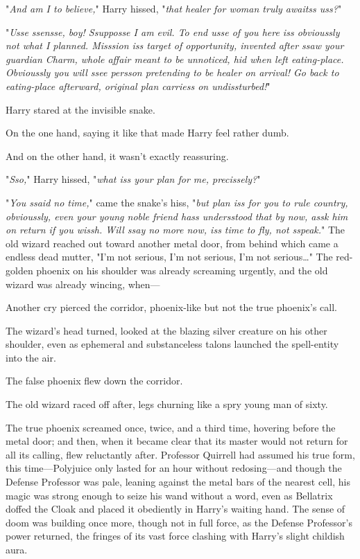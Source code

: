 "\emph{And am I to believe,}" Harry hissed, "\emph{that healer for woman truly 
awaitss uss?}"

"\emph{Usse ssensse, boy! Ssupposse I am evil. To end usse of you here iss 
obvioussly not what I planned. Misssion iss target of opportunity, invented 
after ssaw your guardian Charm, whole affair meant to be unnoticed, hid when 
left eating-place. Obvioussly you will ssee persson pretending to be healer on 
arrival! Go back to eating-place afterward, original plan carriess on 
undissturbed!}"

Harry stared at the invisible snake.

On the one hand, saying it like that made Harry feel rather dumb.

And on the other hand, it wasn't exactly reassuring.

"\emph{Sso,}" Harry hissed, "\emph{what iss your plan for me, precissely?}"

"\emph{You ssaid no time,}" came the snake's hiss, "\emph{but plan iss for you 
to rule country, obvioussly, even your young noble friend hass undersstood that 
by now, assk him on return if you wissh. Will ssay no more now, iss time to 
fly, not sspeak.}"
\sbreak
The old wizard reached out toward another metal door, from behind which came a 
endless dead mutter, "I'm not serious, I'm not serious, I'm not 
serious{\ldots}" The red-golden phoenix on his shoulder was already screaming 
urgently, and the old wizard was already wincing, when---

Another cry pierced the corridor, phoenix-like but not the true phoenix's call.

The wizard's head turned, looked at the blazing silver creature on his other 
shoulder, even as ephemeral and substanceless talons launched the spell-entity 
into the air.

The false phoenix flew down the corridor.

The old wizard raced off after, legs churning like a spry young man of sixty.

The true phoenix screamed once, twice, and a third time, hovering before the 
metal door; and then, when it became clear that its master would not return for 
all its calling, flew reluctantly after.
\sbreak
Professor Quirrell had assumed his true form, this time---Polyjuice only lasted 
for an hour without redosing---and though the Defense Professor was pale, 
leaning against the metal bars of the nearest cell, his magic was strong enough 
to seize his wand without a word, even as Bellatrix doffed the Cloak and placed 
it obediently in Harry's waiting hand. The sense of doom was building once 
more, though not in full force, as the Defense Professor's power returned, the 
fringes of its vast force clashing with Harry's slight childish aura.

